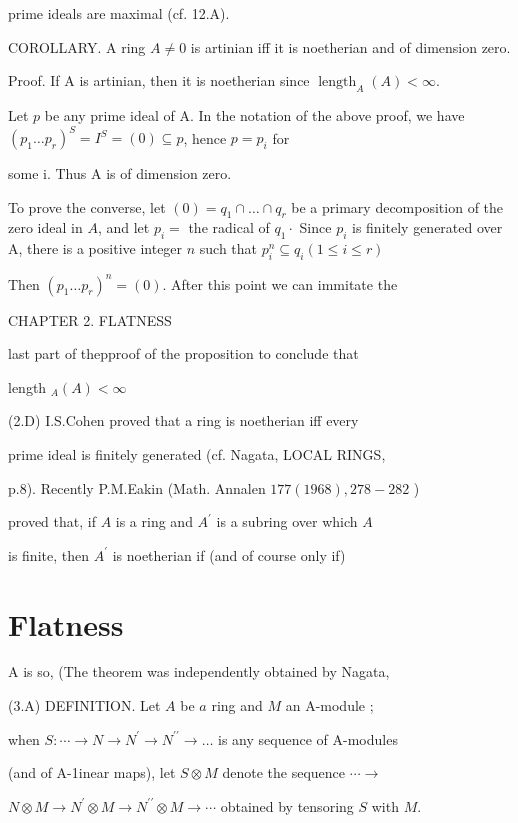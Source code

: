 prime ideals are maximal (cf. 12.A).

COROLLARY. A ring $A \neq 0$ is artinian iff it is noetherian and of dimension zero.

Proof. If A is artinian, then it is noetherian since $\operatorname{length}_{A}(A)<\infty$.

Let $p$ be any prime ideal of A. In the notation of the above proof, we have $\left(p_{1} \ldots p_{r}\right)^{S}=I^{S}=(0) \subseteq p$, hence $p=p_{i}$ for

some i. Thus A is of dimension zero.

To prove the converse, let $(0)=q_{1} \cap \ldots \cap q_{r}$ be a primary decomposition of the zero ideal in $A$, and let $p_{i}=$ the radical of $q_{1} \cdot$ Since $p_{i}$ is finitely generated over A, there is a positive integer $n$ such that $p_{i}^{n} \subseteq q_{i}(1 \leqslant i \leqslant r)$

Then $\left(p_{1} \ldots p_{r}\right)^{n}=(0)$. After this point we can immitate the

CHAPTER 2. FLATNESS

last part of thepproof of the proposition to conclude that

length $_{A}(A)<\infty$

(2.D) I.S.Cohen proved that a ring is noetherian iff every

prime ideal is finitely generated (cf. Nagata, LOCAL RINGS,

p.8). Recently P.M.Eakin (Math. Annalen $177(1968), 278-282$ )

proved that, if $A$ is a ring and $A^{\prime}$ is a subring over which $A$

is finite, then $A^{\prime}$ is noetherian if (and of course only if)

\section{Flatness}
A is so, (The theorem was independently obtained by Nagata,

(3.A) DEFINITION. Let $A$ be $a$ ring and $M$ an A-module ;

when $S: \cdots \rightarrow N \rightarrow N^{\prime} \rightarrow N^{\prime \prime} \rightarrow \ldots$ is any sequence of A-modules

(and of A-1inear maps), let $S \otimes M$ denote the sequence $\cdots \rightarrow$

$N \otimes M \rightarrow N^{\prime} \otimes M \rightarrow N^{\prime \prime} \otimes M \rightarrow \cdots$ obtained by tensoring $S$ with $M .$

